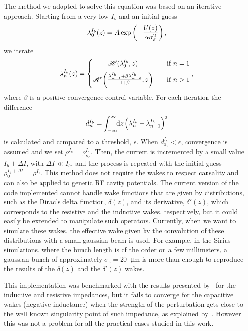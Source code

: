     The method we adopted to solve this equation was based on an iterative approach. Starting from a very low $I_b$ and an initial guess
    \begin{align}
        \lambda_0^{I_b}(z) = A\exp\left(-\frac{U(z)}{\alpha\sigma_\delta^2}\right),
    \end{align}
    we iterate
    \begin{align}
        \lambda_n^{I_b}(z) = \left\{
        \begin{matrix}
            \mathscr{H}(\lambda_0^{I_b},z)       & \quad \text{if } n = 1\\[2mm]
            \mathscr{H}\left(\frac{\lambda_{n-1}^{I_b} + \beta\lambda_{n-2}^{I_b}}{1+\beta},z\right) & \quad \text{if } n > 1
        \end{matrix}\right.,
    \end{align}
    where $\beta$ is a positive convergence control variable. For each iteration the difference
    \begin{align}
        d_n^{I_b} = \int_{-\infty}^{\infty}\!\!\text{d}z \left(\lambda_n^{I_b}-\lambda_{n-1}^{I_b}\right)^2
    \end{align}
    is calculated and compared to a threshold, $\epsilon$. When $d_{n_c}^{I_b}<\epsilon$, convergence is assumed and we set $\rho^{I_b} = \rho_{n_c}^{I_b}$. Then, the current is incremented by a small value $I_b + \Delta I$, with $\Delta I \ll I_b$, and the process is repeated with the initial guess $\rho_0^{I_b+\Delta I} = \rho^{I_b}$. This method does not require the wakes to respect causality and can also be applied to generic RF cavity potentials. The current version of the code implemented cannot handle wake functions that are given by distributions, such as the Dirac's delta function, $\delta(z)$, and its derivative, $\delta'(z)$, which corresponds to the resistive and the inductive wakes, respectively, but it could easily be extended to manipulate such operators. Currently, when we want to simulate these wakes, the effective wake given by the convolution of these distributions with a small gaussian beam is used.
    For example, in the Sirius simulations, where the bunch length is of the order on a few millimeters, a gaussian bunch of approximately $\sigma_z=20$~\si{\micro\meter} is more than enough to reproduce the results of the $\delta(z)$ and the $\delta'(z)$ wakes.

    This implementation was benchmarked with the results presented by~ for the inductive and resistive impedances, but it fails to converge for the capacitive wakes (negative inductance) when the strength of the perturbation gets close to the well known singularity point of such impedance, as explained by~. However this was not a problem for all the practical cases studied in this work.

